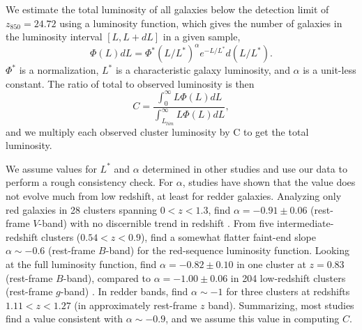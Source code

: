 
We estimate the total luminosity of all galaxies below the detection
limit of $z_{850} = 24.72$ using a \citet{schechter76a}
luminosity function, which gives the number of galaxies in the
luminosity interval $[L,L+dL]$ in a given sample,
\begin{equation}
\Phi(L)dL = \Phi^\ast (L/L^\ast)^\alpha e^{-L/L^\ast} d(L/L^\ast).
\end{equation}
$\Phi^\ast$ is a normalization, $L^\ast$ is a
characteristic galaxy luminosity, and $\alpha$ is a unit-less
constant. The ratio of total to observed luminosity is then
\begin{equation}
C = \frac{\int_0^\infty L\Phi(L)dL}{\int_{L_{lim}}^\infty L\Phi(L)dL},
\end{equation}
and we multiply each observed cluster luminosity by C to get the total
luminosity. 

We assume values for $L^\ast$ and $\alpha$ determined in other studies
and use our data to perform a rough consistency check. For $\alpha$,
studies have shown that the value does not evolve much from low
redshift, at least for redder galaxies. Analyzing only red galaxies in
28 clusters spanning $0 < z < 1.3$, \citet{andreon08a} find $\alpha =
-0.91 \pm 0.06$ (rest-frame $V$-band) with no discernible trend in
redshift \citep[see also][]{andreon06a,andreon06c}. From five
intermediate-redshift clusters ($0.54<z<0.9$), \citet{crawford09a}
find a somewhat flatter faint-end slope $\alpha \sim -0.6$ (rest-frame
$B$-band) for the red-sequence luminosity function. Looking at the
full luminosity function, \citet{goto05a} find $\alpha = -0.82 \pm
0.10$ in one cluster at $z=0.83$ (rest-frame $B$-band), compared to
$\alpha = -1.00 \pm 0.06$ in 204 low-redshift clusters (rest-frame
$g$-band) \citep{goto02a}. In redder bands, \citet{strazzullo06a} find
$\alpha \sim -1$ for three clusters at redshifts $1.11 < z < 1.27$ (in
approximately rest-frame $z$ band). Summarizing, most studies find a
value consistent with $\alpha \sim -0.9$, and we assume this value in
computing $C$.


